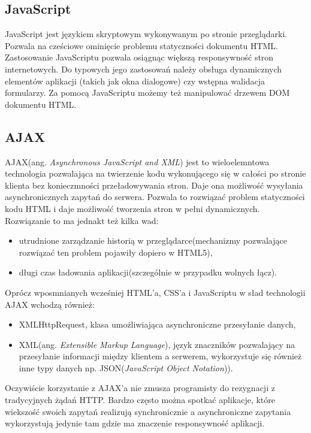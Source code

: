 \subsection[JavaScript][JavaScript]{JavaScript}
JavaScript jest językiem skryptowym wykonywanym po stronie przeglądarki. Pozwala na cześciowe ominięcie problemu statyczności dokumentu HTML. Zastosowanie JavaScriptu pozwala osiągnąc większą responsywność stron internetowych. Do typowych jego zastosowań należy obsługa dynamicznych elementów aplikacji (takich jak okna dialogowe) czy wstępna walidacja formularzy. Za pomocą JavaScriptu możemy też manipulować drzewem DOM dokumentu HTML.

\subsection[AJAX][AJAX]{AJAX}
AJAX(ang. \textit{Asynchronous JavaScript and XML}) jest to wieloelemntowa technologia pozwalająca na twierzenie kodu wykonującego się w całości po stronie klienta bez konieczmności przeładowywania stron. Daje ona możliwość wysyłania asynchronicznych zapytań do serwera. Pozwala to rozwiązać problem statyczności kodu HTML i daje możliwość tworzenia stron w pełni dynamicznych. Rozwiązanie to ma jednakt też kilka wad:
\begin{itemize}
	\item utrudnione zarządzanie historią w przeglądarce(mechanizmy pozwalające rozwiązać ten problem pojawiły dopiero w HTML5),
	\item długi czas ładowania aplikacji(szczególnie w przypadku wolnych łącz).
\end{itemize}
Oprócz wposmnianych wcześniej HTML'a, CSS'a i JavaScriptu w sład technologii AJAX wchodzą również:
\begin{itemize}
	\item XMLHttpRequest, klasa umożliwiająca asynchroniczne przesyłanie danych,
	\item XML(ang. \textit{Extensible Markup Language}), język znaczników pozwalający na przesyłanie informacji między klientem a serwerem, wykorzystuje się również inne typy danych np. JSON(\textit{JavaScript Object Notation})).
\end{itemize}
Oczywiście korzystanie z AJAX'a nie zmusza programisty do rezygnacji z tradycyjnych żądań HTTP. Bardzo często można spotkać aplikacje, które wiekszość swoich zapytań realizują synchronicznie a asynchroniczne zapytania wykorzystują jedynie tam gdzie ma znaczenie responsywność aplikacji.

